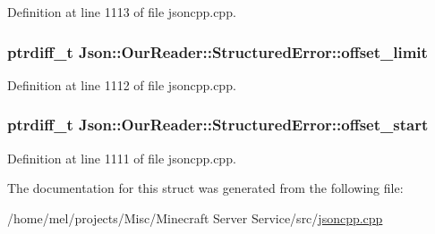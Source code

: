Definition at line 1113 of file jsoncpp.\+cpp.

\subsubsection[{\texorpdfstring{offset\+\_\+limit}{offset_limit}}]{\setlength{\rightskip}{0pt plus 5cm}ptrdiff\+\_\+t Json\+::\+Our\+Reader\+::\+Structured\+Error\+::offset\+\_\+limit}\hypertarget{struct_json_1_1_our_reader_1_1_structured_error_a15491a751a39c5153af04e68b1d0abb9}{}\label{struct_json_1_1_our_reader_1_1_structured_error_a15491a751a39c5153af04e68b1d0abb9}


Definition at line 1112 of file jsoncpp.\+cpp.

\subsubsection[{\texorpdfstring{offset\+\_\+start}{offset_start}}]{\setlength{\rightskip}{0pt plus 5cm}ptrdiff\+\_\+t Json\+::\+Our\+Reader\+::\+Structured\+Error\+::offset\+\_\+start}\hypertarget{struct_json_1_1_our_reader_1_1_structured_error_a102677698afb8177c985e72dafe72b15}{}\label{struct_json_1_1_our_reader_1_1_structured_error_a102677698afb8177c985e72dafe72b15}


Definition at line 1111 of file jsoncpp.\+cpp.



The documentation for this struct was generated from the following file\+:\begin{DoxyCompactItemize}
\item 
/home/mel/projects/\+Misc/\+Minecraft Server Service/src/\hyperlink{jsoncpp_8cpp}{jsoncpp.\+cpp}\end{DoxyCompactItemize}
